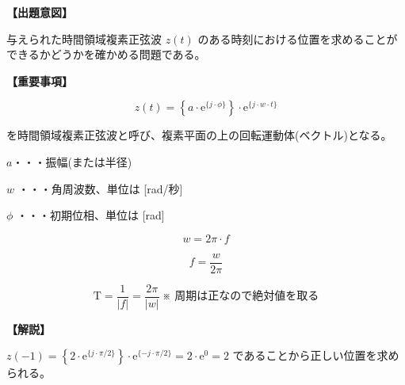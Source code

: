 \noindent \textbf{【出題意図】}

\bigskip
\noindent 与えられた時間領域複素正弦波 $z(t)$ のある時刻における位置を求めることができるかどうかを確かめる問題である。

\vspace{1em}
\noindent \textbf{【重要事項】}

\[
z(t) =  \left \{ a \cdot \textrm{e}^{\{j \cdot \phi\}} \right \} 
\cdot \textrm{e}^{\{j \cdot w \cdot t \}}
\]

\bigskip
\noindent を時間領域複素正弦波と呼び、複素平面の上の回転運動体(ベクトル)となる。

\bigskip
\noindent\quad  $a$・・・振幅(または半径)

\bigskip
\noindent\quad $w$ ・・・角周波数、単位は [rad/秒]

\bigskip
\noindent\quad $\phi$ ・・・初期位相、単位は [rad]

\[
w = 2\pi \cdot f
\]

\[
f = \frac{w}{2\pi} 
\]

\[
\textrm{T} = \frac{1}{|f|} = \frac{2\pi}{|w|}   \ \mbox{※ 周期は正なので絶対値を取る}
\]

\bigskip
\vspace{1em}
\noindent \textbf{【解説】}

\bigskip
\noindent 
$
z(-1) =  \left \{ 2 \cdot \textrm{e}^{\{j \cdot \pi/2 \}} \right \} \cdot \textrm{e}^{\{ -j \cdot \pi/2 \}}
= 2 \cdot \textrm{e}^{0} = 2$ であることから正しい位置を求められる。
